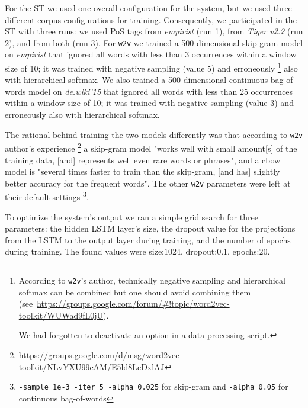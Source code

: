 \documentclass[11pt]{article}
\newcommand\wtv{\texttt{w2v}\xspace}
\begin{document}
For the ST we used one overall configuration for the system, but we used three
different corpus configurations for training.
Consequently, we participated in the ST with three runs:
we used PoS tags from \emph{empirist} (run 1), from \emph{Tiger v2.2} (run 2),
and from both (run 3).  
For \wtv we trained a 500-dimensional skip-gram model on \emph{empirist} that
ignored all words with less than 3 occurrences within a window size of 10;
it was trained with negative sampling (value 5) and erroneously%
\footnote{%
    According to \wtv's author, technically negative sampling and
    hierarchical softmax can be combined but one should avoid combining them~%
    (see~\url{https://groups.google.com/forum/\#!topic/word2vec-toolkit/WUWad9fL0jU}).
    
    We had forgotten to deactivate an option in a data processing script.
}
also with hierarchical softmax.
We also trained a 500-dimensional continuous bag-of-words model on
\emph{de.wiki'15} that ignored all words with less than 25 occurrences within a
window size of 10; it was trained with negative sampling (value 3) and
erroneously also with hierarchical softmax.

The rational behind training the two models differently was that according to
\wtv author's experience%
\footnote{\url{https://groups.google.com/d/msg/word2vec-toolkit/NLvYXU99cAM/E5ld8LcDxlAJ}}
a skip-gram model "works well with small amount[s] of the training data, [and]
represents well even rare words or phrases", and a cbow model is "several times
faster to train than the skip-gram, [and has] slightly better accuracy for the
frequent words".
The other \wtv parameters were left at their default settings%
\footnote{\texttt{-sample 1e-3 -iter 5 -alpha 0.025} for skip-gram and
\texttt{-alpha 0.05} for continuous bag-of-words}.

To optimize the system's output we ran a simple grid search for three
parameters: the hidden LSTM layer's size, the dropout value for the projections
from the LSTM to the output layer during training, and the number of epochs
during training. 
The found values were size:$1024$, dropout:$0.1$, epochs:$20$.
\end{document}
